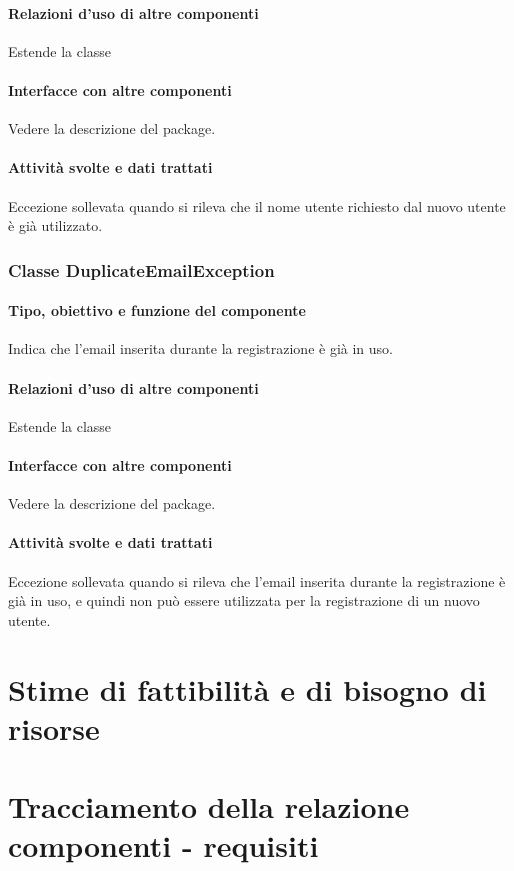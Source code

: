 \subsubsection*{Relazioni d'uso di altre componenti}
Estende la classe 
\subsubsection*{Interfacce con altre componenti}
Vedere la descrizione del package.
\subsubsection*{Attivit\`a svolte e dati trattati}
Eccezione sollevata quando si rileva che il nome utente richiesto dal nuovo
utente \`e gi\`a utilizzato.

\subsection{Classe DuplicateEmailException}
\subsubsection*{Tipo, obiettivo e funzione del componente}
Indica che l'email inserita durante la registrazione \`e gi\`a in uso.
\subsubsection*{Relazioni d'uso di altre componenti}
Estende la classe 
\subsubsection*{Interfacce con altre componenti}
Vedere la descrizione del package.
\subsubsection*{Attivit\`a svolte e dati trattati}
Eccezione sollevata quando si rileva che l'email inserita durante la
registrazione \`e gi\`a in uso, e quindi non pu\`o essere utilizzata per la
registrazione di un nuovo utente.


\chapter{Stime di fattibilit\`a e di bisogno di risorse}

\chapter{Tracciamento della relazione componenti - requisiti}

\listoftables
{}
\listoffigures
{}

